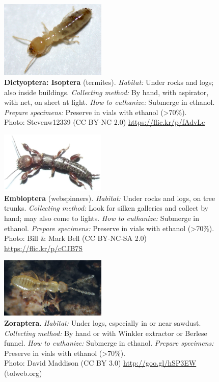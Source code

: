 \documentclass[letterpaper, 11pt]{article}
\begin{document}
\clearpage

\begin{figure}
  \caption*{\textbf{Dictyoptera: Isoptera} (termites). \textit{Habitat:} Under rocks and logs; also inside buildings. \textit{Collecting method:} By hand, with aspirator, with net, on sheet at light. \textit{How to euthanize:} Submerge in ethanol. \textit{Prepare specimens:} Preserve in vials with ethanol (\textgreater70\%). \\ Photo: Stevenw12339 (CC BY-NC 2.0) \url{https://flic.kr/p/fAdvLc}}
  \includegraphics[width=0.45\textwidth]{BlattodeaIsoptera}
\end{figure}

\begin{figure}
  \caption*{\textbf{Embioptera} (webspinners). \textit{Habitat:} Under rocks and logs, on tree trunks. \textit{Collecting method:} Look for silken galleries and collect by hand; may also come to lights. \textit{How to euthanize:} Submerge in ethanol. \textit{Prepare specimens:} Preserve in vials with ethanol (\textgreater70\%).\\ Photo: Bill \& Mark Bell (CC BY-NC-SA 2.0) \url{https://flic.kr/p/cCJB7S}}
  \includegraphics[width=0.45\textwidth]{Embioptera}
\end{figure}

\begin{figure}
  \caption*{\textbf{Zoraptera}. \textit{Habitat:} Under logs, especially in or near sawdust. \textit{Collecting method:} By hand or with Winkler extractor or Berlese funnel. \textit{How to euthanize:} Submerge in ethanol. \textit{Prepare specimens:} Preserve in vials with ethanol (\textgreater70\%).\\ Photo: David Maddison (CC BY 3.0) \url{http://goo.gl/hSP3EW} (tolweb.org)}
  \includegraphics[width=0.45\textwidth]{Zoraptera}
\end{figure}
\end{document}
